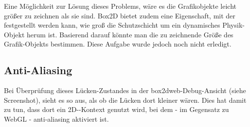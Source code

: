 Eine Möglichkeit zur Lösung dieses Problems, wäre es die Grafikobjekte leicht größer zu zeichnen als sie sind. Box2D bietet zudem eine Eigenschaft, mit der festgestellt werden kann, wie groß die Schutzschicht um ein dynamisches Physik-Objekt herum ist. Basierend darauf könnte man die zu zeichnende Größe des Grafik-Objekts bestimmen. Diese Aufgabe wurde jedoch noch nicht erledigt.

\subsection{Anti-Aliasing}

Bei Überprüfung dieses Lücken-Zustandes in der box2dweb-Debug-Ansicht (siehe Screenshot), sieht es so aus, als ob die Lücken dort kleiner wären. Dies hat damit zu tun, dass dort ein 2D--Kontext genutzt wird, bei dem - im Gegensatz zu WebGL - anti-aliasing aktiviert ist.

